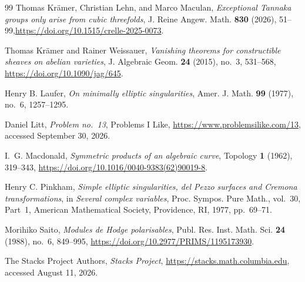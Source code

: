 \documentclass[10pt]{amsart}
\numberwithin{equation}{section}
\theoremstyle{definition}
\theoremstyle{remark}
\begin{document}
\begin{thebibliography}{99}
Thomas Kr\"amer, Christian Lehn, and Marco Maculan,
\emph{Exceptional Tannaka groups only arise from cubic threefolds}, J. Reine Angew. Math. \textbf{830} (2026), 51--99,\newblock \url{https://doi.org/10.1515/crelle-2025-0073}.

Thomas Kr\"amer and Rainer Weissauer,
\emph{Vanishing theorems for constructible sheaves on abelian varieties}, J. Algebraic Geom. \textbf{24} (2015), no.~3, 531--568,
\newblock \url{https://doi.org/10.1090/jag/645}.

Henry B. Laufer,
\emph{On minimally elliptic singularities}, Amer. J. Math. \textbf{99} (1977), no.~6, 1257--1295.

Daniel Litt,
\emph{Problem no.~13}, Problems I Like, \url{https://www.problemsilike.com/13}, accessed September 30, 2026.

I.~G. Macdonald,
\emph{Symmetric products of an algebraic curve}, Topology \textbf{1} (1962), 319--343,
\newblock \url{https://doi.org/10.1016/0040-9383(62)90019-8}.

Henry C. Pinkham,
\emph{Simple elliptic singularities, del Pezzo surfaces and Cremona transformations}, in \emph{Several complex variables}, Proc. Sympos. Pure Math., vol.~30, Part~1, American Mathematical Society, Providence, RI, 1977, pp.~69--71.

Morihiko Saito,
\emph{Modules de Hodge polarisables}, Publ. Res. Inst. Math. Sci. \textbf{24} (1988), no.~6, 849--995,
\newblock \url{https://doi.org/10.2977/PRIMS/1195173930}.

The Stacks Project Authors,
\emph{Stacks Project}, \url{https://stacks.math.columbia.edu}, accessed August 11, 2026.

\end{thebibliography}
\end{document}

